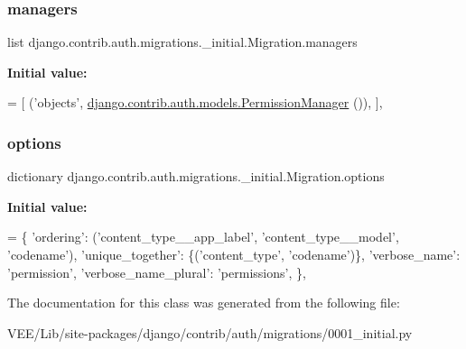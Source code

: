 \subsubsection{\texorpdfstring{managers}{managers}}
{\footnotesize\ttfamily list django.\+contrib.\+auth.\+migrations.\+\_\+initial.\+Migration.\+managers\hspace{0.3cm}{\ttfamily [static]}}

{\bfseries Initial value\+:}
\begin{DoxyCode}
= [
                (\textcolor{stringliteral}{'objects'}, \mbox{\hyperlink{classdjango_1_1contrib_1_1auth_1_1models_1_1_permission_manager}{django.contrib.auth.models.PermissionManager}}
      ()),
            ],
\end{DoxyCode}
\mbox{\label{classdjango_1_1contrib_1_1auth_1_1migrations_1_10001__initial_1_1_migration_ab1a70eb115efdb02e5ac5dc22204306c}} 
\subsubsection{\texorpdfstring{options}{options}}
{\footnotesize\ttfamily dictionary django.\+contrib.\+auth.\+migrations.\+\_\+initial.\+Migration.\+options\hspace{0.3cm}{\ttfamily [static]}}

{\bfseries Initial value\+:}
\begin{DoxyCode}
= \{
                \textcolor{stringliteral}{'ordering'}: (\textcolor{stringliteral}{'content\_type\_\_app\_label'}, \textcolor{stringliteral}{'content\_type\_\_model'}, \textcolor{stringliteral}{'codename'}),
                \textcolor{stringliteral}{'unique\_together'}: \{(\textcolor{stringliteral}{'content\_type'}, \textcolor{stringliteral}{'codename'})\},
                \textcolor{stringliteral}{'verbose\_name'}: \textcolor{stringliteral}{'permission'},
                \textcolor{stringliteral}{'verbose\_name\_plural'}: \textcolor{stringliteral}{'permissions'},
            \},
\end{DoxyCode}


The documentation for this class was generated from the following file\+:\begin{DoxyCompactItemize}
\item 
V\+E\+E/\+Lib/site-\/packages/django/contrib/auth/migrations/0001\+\_\+initial.\+py\end{DoxyCompactItemize}
